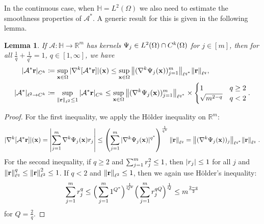 \documentclass[10pt,a4paper,onecolumn]{article}
\numberwithin{equation}{section}
\newtheorem{lemma}{Lemma}[section]\newtheorem{example}{Example}[section]
\let\F\mathds\let\C\mathcal\newcommand{\R}{\F{R}}\newcommand{\A}{\C{A}}
\newcommand{\norm}[1]{{\left\lVert #1 \right\rVert}}
\newcommand{\splitln}[4]{\begin{cases} #1 & #2 \\ #3 & #4\end{cases}}
\renewcommand{\vec}{\mathbf}
\newcommand{\UCmath}[1]{%
	\begingroup
	\ucmathlist\uppercase\expandafter{#1}%
	\endgroup
}
\newcommand{\ucmathlist}{%
	\def\alpha{\mathrm{A}}%
	\def\beta{\mathrm{B}}%
	\let\gamma=\Gamma
	\let\delta=\Delta
	\def\epsilon{\mathrm{E}}%
	\def\varepsilon{\mathrm{E}}%
	\def\zeta{\mathrm{Z}}%
	\def\eta{\mathrm{H}}%
	\let\theta=\Theta
	\let\vartheta=\Theta
	\def\iota{\mathrm{I}}%
	\def\kappa{\mathrm{K}}%
	\let\lambda=\Lambda
	\def\mu{\mathrm{M}}%
	\def\nu{\mathrm{N}}%
	\let\xi=\Xi
	\let\pi=\Pi
	\let\varpi=\Pi
	\def\rho{\mathrm{P}}%
	\def\varrho{\mathrm{P}}%
	\let\sigma=\Sigma
	\def\tau{\mathrm{T}}%
	\let\upsilon=\Upsilon
	\let\phi=\Phi
	\let\varphi=\Phi
	\def\chi{\mathrm{X}}%
	\let\psi=\Psi
	\let\omega=\Omega
}
\newcommand{\caps}[1]{\UCmath{#1}}
\newcommand*{\vard}[1]{%
	\IfEqCase{#1}{%
		{0}{\varphi}%
		{1}{\psi}%
	}[\varphi #1]%
}
\newcommand*{\varx}[1]{%
	\IfEqCase{#1}{%
		{0}{x}%
		{1}{y}%
		{2}{z}%
		{3}{r}%
	}[x#1]%
}
\newcommand{\Domain}{\Omega}
\newcommand*{\Varx}[1]{\caps{\varx{#1}}}
\newcommand*{\vvarx}[1]{\vec{\varx{#1}}}\newcommand*{\vVarx}[1]{\vec{\Varx{#1}}}
\begin{document}
In the continuous case, when $\F H=L^2(\Domain)$ we also need to estimate the smoothness properties of $\A^*$. A generic result for this is given in the following lemma.
\begin{lemma}\label{thm: norm bound smoothness}
	If $\A\colon \F H \to \R^m$ has kernels $\vard1_j\in L^2(\Domain)\cap C^k(\Domain)$ for $j\in[m]$, then for all $\frac1q+\frac1{q^*}=1$, $q\in[1,\infty]$, we have
	\begin{align}
		|\A^*\vvarx3|_{C^k}&\coloneqq \sup_{\vvarx0\in\Domain} |\nabla^k[\A^*\vvarx3]|(\vvarx0) \leq \sup_{\vvarx0\in\Domain}\norm{(\nabla^k\vard1_j(\vvarx0))_{j=1}^m}_{\ell^{q^*}}\norm{\vvarx3}_{\ell^q},
		\\ |\A^*|_{\ell^2\to C^k}&\coloneqq \sup_{\norm{\vvarx3}_{\ell^2}\leq 1} |\A^*\vvarx3|_{C^k} \leq \sup_{\vvarx0\in\Domain}\norm{(\nabla^k\vard1_j(\vvarx0))_{j=1}^m}_{\ell^{q^*}}\times \splitln{1}{q\geq 2}{\sqrt{m^{2-q}}}{q<2}.
	\end{align}
\end{lemma}
\begin{proof}
	For the first inequality, we apply the H\"older inequality on $\R^m$:
	$$ |\nabla^k[\A^*\vvarx3]|(\vvarx0) = \left|\sum_{j=1}^m\nabla^k\vard1_j(\vvarx0)\varx3_j\right|
	\leq \left(\sum_{j=1}^m|\nabla^k\vard1_j(\vvarx0)|^{q^*}\right)^{\frac{1}{q^*}}\norm{\vvarx3}_{\ell^q} = \norm{(\nabla^k\vard1_j(\vvarx0))_j}_{\ell^{q^*}}\norm{\vvarx3}_{\ell^q}\;.$$
	For the second inequality, if $q\geq2$ and $\sum_{j=1}^m \varx3_j^2\leq 1$, then $|\varx3_j|\leq 1$ for all $j$ and $\norm{\vvarx3}_{\ell^q}^q\leq \norm{\vvarx3}_{\ell^2}^2\leq 1$. If $q<2$ and $\norm{\vvarx3}_{\ell^2}\leq 1$, then we again use H\"older's inequality:
	$$\sum_{j=1}^m \varx3_j^q \leq \Big(\sum_{j=1}^m 1^{Q^*}\Big)^{\frac1{Q^*}} \Big(\sum_{j=1}^m \varx3_j^{qQ}\Big)^{\frac1{Q}} \leq m^{\frac{2-q}{2}}$$
	for $Q = \frac2q$.
\end{proof}
\end{document}
